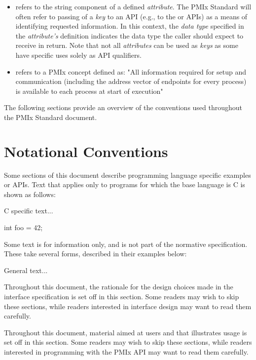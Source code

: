 \begin{itemize}
\item {} refers to the string component of a defined \emph{attribute}. The \ac{PMIx} Standard will often refer to passing of a \emph{key} to an \ac{API} (e.g., to the  or  \acp{API}) as a means of identifying requested information. In this context, the \emph{data type} specified in the \emph{attribute's} definition indicates the data type the caller should expect to receive in return. Note that not all \emph{attributes} can be used as \emph{keys} as some have specific uses solely as \ac{API} qualifiers.

\item {} refers to a \ac{PMIx} concept defined as: "All information required for setup and communication (including the address vector of endpoints for every process) is available to each process at start of execution"

\end{itemize}

The following sections provide an overview of the conventions used throughout the \ac{PMIx} Standard document.

\section{Notational Conventions}

Some sections of this document describe programming language specific examples or \acp{API}.
Text that applies only to programs for which the base language is C is shown as follows:

\cspecificstart
C specific text...
\begin{codepar}
int foo = 42;
\end{codepar}
\cspecificend

Some text is for information only, and is not part of the normative specification.
These take several forms, described in their examples below:

\notestart
\noteheader
General text...
\noteend

\rationalestart
Throughout this document, the rationale for the design choices made in the interface specification is set off in this section.
Some readers may wish to skip these sections, while readers interested in interface design may want to read them carefully.
\rationaleend

\adviceuserstart
Throughout this document, material aimed at users and that illustrates usage is set off in this section.
Some readers may wish to skip these sections, while readers interested in programming with the \ac{PMIx} \ac{API} may want to read them carefully.
\adviceuserend

